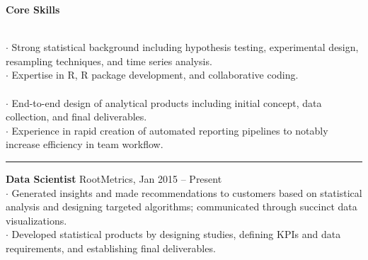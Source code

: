 \documentclass[letterpaper, onecolumn, oneside]{article}
\newcommand{\dotindent}{\hspace*{.25in}$\cdot$ }
\newcommand{\spaceindent}{\hspace*{0.1in}}
\begin{document}
\begin{flushleft}


\textbf{\large Core Skills}
\vspace*{0.05in}

\spaceindent {\bf Statistics and Analysis} \\
\dotindent Strong statistical background including hypothesis testing, experimental design, resampling techniques, and time series analysis. \\
\dotindent Expertise in R, R package development, and collaborative coding. %
~\\

\spaceindent {\bf Analytical Product Development} \\
\dotindent End-to-end design of analytical products including initial concept, data collection, and final deliverables. \\
\dotindent Experience in rapid creation of automated reporting pipelines to notably increase efficiency in team workflow.   \\

\textcolor{litegrey}{\rule{\textwidth}{.1pt}}


\vspace*{0.1in}



\textbf{\large Data Scientist} RootMetrics, Jan 2015 -- Present \\
\dotindent Generated insights and made recommendations to customers based on statistical analysis and designing targeted algorithms; communicated through succinct data visualizations.  \\
\dotindent Developed statistical products by designing studies, defining KPIs and data requirements, and establishing final deliverables.  \\
~\\


\end{flushleft}
\end{document}
